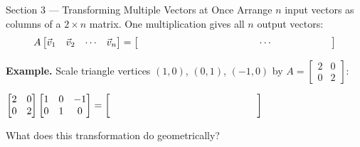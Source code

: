 \documentclass[10pt]{article}
\begin{document}
\begin{notesbox}{Section 3 --- Transforming Multiple Vectors at Once}
\small
Arrange $n$ input vectors as columns of a $2\times n$ matrix.
One multiplication gives all $n$ output vectors:
\[
  A\begin{bmatrix}\vec{v}_1 & \vec{v}_2 & \cdots & \vec{v}_n\end{bmatrix}
  = \begin{bmatrix}\hspace{1.8cm} & \hspace{1.8cm} & \cdots & \hspace{1.8cm}\end{bmatrix}
\]

\textbf{Example.}  Scale triangle vertices $(1,0)$, $(0,1)$, $(-1,0)$ by
$A = \begin{bmatrix}2&0\\0&2\end{bmatrix}$:

\vspace{0.06in}
$\begin{bmatrix}2&0\\0&2\end{bmatrix}
\begin{bmatrix}1 & 0 & -1\\ 0 & 1 & 0\end{bmatrix}
= \begin{bmatrix}\hspace{1.5cm}&\hspace{1.5cm}&\hspace{1.5cm}\\\hspace{1.5cm}&\hspace{1.5cm}&\hspace{1.5cm}\end{bmatrix}$

\vspace{0.08in}
What does this transformation do geometrically?  \writeline
\end{notesbox}

\vspace{0.08in}
\end{document}
